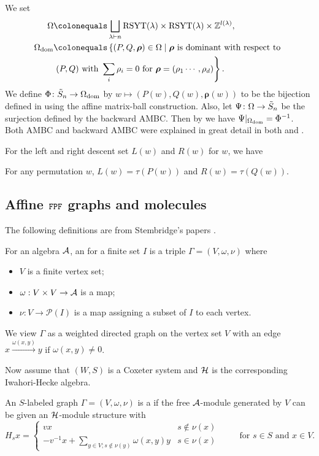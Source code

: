 \documentclass[11pt]{article}
\begin{document}
We set
\begin{align*}
\Omega &\colonequals \bigsqcup_{\lambda\vdash n} \RSYT(\lambda) \times \RSYT(\lambda) \times \ZZ^{l(\lambda)},\\
\dom &\colonequals \left\{(P, Q, \boldsymbol{\rho}) \in \Omega \mid \boldsymbol{\rho} \textup{ is dominant with respect to } \right.\\
&\left.(P,Q) \textup{ with  }\sum_i \rho_i = 0 \text{ for }\boldsymbol{\rho}=(\rho_1\cdots,\rho_d)\right\}.
\end{align*}
We define $\Phi \colon \tilde S_n \rightarrow \Omega_{\mathrm{dom}}$ by $w \mapsto (P(w), Q(w), \boldsymbol{\rho}(w))$ to be the bijection defined in \cite{CPY} using the affine matrix-ball construction. Also, let $\Psi \colon \Omega \rightarrow \tilde S_n$ be the surjection defined by the backward AMBC. Then by \cite[Theorem 5.12]{CPY} we have $\Psi|_{\Omega_{\mathrm{dom}}} = \Phi^{-1}$. Both AMBC and backward AMBC were explained in great detail in both \cite{CPY} and \cite{CLP}.


For the left and right descent set $L(w)$ and $R(w)$ for $w$, we have 
\begin{proposition}
\label{prop:descents}
For any permutation $w$, $L(w) = \tau(P(w))$ and $R(w) = \tau(Q(w))$.
\end{proposition}



\subsection{Affine ${\tt {FPF}}$ graphs and molecules}
The following definitions are from Stembridge's papers \cite{Stem1,Stem2}.
\begin{definition}
For an algebra $\mathcal{A}$, an  for a finite set $I$ is a triple $\Gamma=(V,\omega,\nu)$ where
\begin{itemize}
\item[(i)] $V$ is a finite vertex set;
\item[(ii)] $\omega: V\times V\to \mathcal{A}$ is a map;
\item[(iii)] $\nu: V\to \mathcal{P}(I)$ is a map assigning a subset of $I$ to each vertex.
\end{itemize}
We view $\Gamma$ as a weighted directed graph on the vertex set $V$ with an edge  $x\xrightarrow{\omega(x,y)} y$ if $\omega(x,y)\neq 0$.
\end{definition}

Now assume that $(W,S)$ is a Coxeter system and $\mathcal H$ is the corresponding Iwahori-Hecke algebra. 
\begin{definition}
An $S$-labeled graph $\Gamma=(V,\omega,\nu)$ is a  if the free $\mathcal{A}$-module generated by $V$ can be given an $\mathcal H$-module structure with
\[
H_sx=\begin{cases}vx&s\not\in\nu(x)\\
-v^{-1}x+\sum_{y\in V;s\not\in\nu(y)}\omega(x,y)y&s\in\nu(x)\end{cases}
\qquad \text{ for }s\in S\text{ and }x\in V.
\]
\end{definition}
\end{document}
